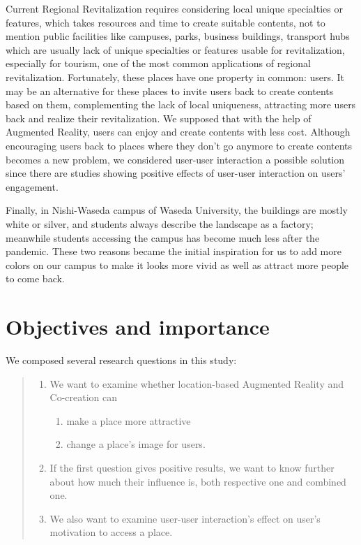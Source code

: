 Current Regional Revitalization requires considering local unique \cite{prime_minister_of_japan_and_his_cabinet_2014} specialties or features, which takes resources and time to create suitable contents,
not to mention public facilities like campuses, parks, business buildings, transport hubs which are usually lack of unique specialties or features usable for revitalization,
especially for tourism, one of the most common applications of regional revitalization.
Fortunately, these places have one property in common: users. It may be an alternative for these places to invite users back to create contents based on them,
complementing the lack of local uniqueness, attracting more users back and realize their revitalization.
We supposed that with the help of Augmented Reality, users can enjoy and create contents with less cost.
Although encouraging users back to places where they don't go anymore to create contents becomes a new problem,
we considered user-user interaction a possible solution since there are studies showing positive effects of user-user interaction on users' engagement.


Finally, in Nishi-Waseda campus of Waseda University, the buildings are mostly white or silver, and students always describe the landscape as a factory; meanwhile students accessing the campus has become much less after the pandemic.
These two reasons became the initial inspiration for us to add more colors on our campus to make it looks more vivid as well as attract more people to come back.

\section{Objectives and importance}


We composed several research questions in this study:
\begin{quote}
  \begin{enumerate}
    \item We want to examine whether location-based Augmented Reality and Co-creation can
      \begin{enumerate}
        \item make a place more attractive
        \item change a place's image for users.
      \end{enumerate}
    \item If the first question gives positive results, we want to know further about how much their influence is, both respective one and combined one.
    \item We also want to examine user-user interaction's effect on user's motivation to access a place.
  \end{enumerate}
\end{quote}

